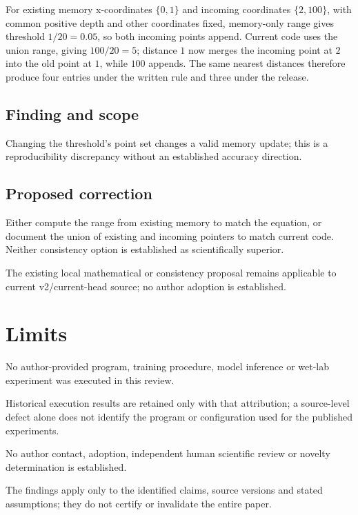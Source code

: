 \documentclass[11pt]{article}
\begin{document}
For existing memory x-coordinates \(\{0,1\}\) and incoming coordinates \(\{2,100\}\), with common positive depth and other coordinates fixed, memory-only range gives threshold \(1/20=0.05\), so both incoming points append. Current code uses the union range, giving \(100/20=5\); distance \(1\) now merges the incoming point at \(2\) into the old point at \(1\), while \(100\) appends. The same nearest distances therefore produce four entries under the written rule and three under the release.

\subsection*{Finding and scope}

Changing the threshold’s point set changes a valid memory update; this is a reproducibility discrepancy without an established accuracy direction.

\subsection*{Proposed correction}

Either compute the range from existing memory to match the equation, or document the union of existing and incoming pointers to match current code. Neither consistency option is established as scientifically superior.

The existing local mathematical or consistency proposal remains applicable to current v2/current-head source; no author adoption is established.

\section*{Limits}

No author-provided program, training procedure, model inference or wet-lab experiment was executed in this review.\par

Historical execution results are retained only with that attribution; a source-level defect alone does not identify the program or configuration used for the published experiments.\par

No author contact, adoption, independent human scientific review or novelty determination is established.\par

The findings apply only to the identified claims, source versions and stated assumptions; they do not certify or invalidate the entire paper.\par
\end{document}
